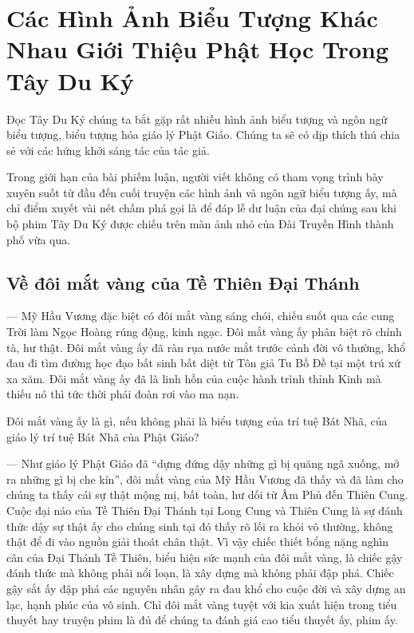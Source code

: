 \chapter{Các Hình Ảnh Biểu Tượng Khác Nhau Giới Thiệu Phật Học Trong Tây Du Ký} %
\label{cha:cac_hinh_anh_bieu_tuong_khac_nhau_gioi_thieu_phat_hoc_trong_tay_du_ky}

Đọc Tây Du Ký chúng ta bắt gặp rất nhiều hình ảnh biểu tượng và ngôn ngữ biểu tượng, biểu tượng hóa giáo lý Phật Giáo. Chúng ta sẽ có dịp thích thú chia sẻ với các hứng khởi sáng tác của tác giả.

Trong giới hạn của bài phiếm luận, người viết không có tham vọng trình bày xuyên suốt từ đầu đến cuối truyện các hình ảnh và ngôn ngữ biểu tượng ấy, mà chỉ điểm xuyết vài nét chấm phá gọi là để đáp lễ dư luận của đại chúng sau khi bộ phim Tây Du Ký được chiếu trên màn ảnh nhỏ của Đài Truyền Hình thành phố vừa qua.

\section{Về đôi mắt vàng của Tề Thiên Đại Thánh} %
\label{sec:ve_doi_mat_vang_cua_te_thien}

— Mỹ Hầu Vương đặc biệt có đôi mắt vàng sáng chói, chiếu suốt qua các cung Trời làm Ngọc Hoàng rúng động, kinh ngạc. Đôi mắt vàng ấy phân biệt rõ chính tà, hư thật. Đôi mắt vàng ấy đã ràn rụa nước mắt trước cảnh đời vô thường, khổ đau đi tìm đường học đạo bất sinh bất diệt từ Tôn giả Tu Bồ Đề tại một trú xứ xa xăm. Đôi mắt vàng ấy đã là linh hồn của cuộc hành trình thỉnh Kinh mà thiếu nó thì tức thời phái đoàn rơi vào ma nạn.

Đôi mắt vàng ấy là gì, nếu không phải là biểu tượng của trí tuệ Bát Nhã, của giáo lý trí tuệ Bát Nhã của Phật Giáo?

— Như giáo lý Phật Giáo đã ``dựng đứng dậy những gì bị quăng ngã xuống, mở ra những gì bị che kín'', đôi mắt vàng của Mỹ Hầu Vương đã thấy và đã làm cho chúng ta thấy cái sự thật mộng mị, bất toàn, hư dối từ Âm Phủ đến Thiên Cung. Cuộc đại náo của Tề Thiên Đại Thánh tại Long Cung và Thiên Cung là sự đánh thức dậy sự thật ấy cho chúng sinh tại đó thấy rõ lối ra khỏi vô thường, không thật để đi vào nguồn giải thoát chân thật. Vì vậy chiếc thiết bổng nặng nghìn cân của Đại Thánh Tề Thiên, biểu hiện sức mạnh của đôi mắt vàng, là chiếc gậy đánh thức mà không phải nổi loạn, là xây dựng mà không phải đập phá. Chiếc gậy sắt ấy đập phá các nguyên nhân gây ra đau khổ cho cuộc đời và xây dựng an lạc, hạnh phúc của vô sinh. Chỉ đôi mắt vàng tuyệt với kia xuất hiện trong tiểu thuyết hay truyện phim là đủ để chúng ta đánh giá cao tiểu thuyết ấy, phim ấy.

